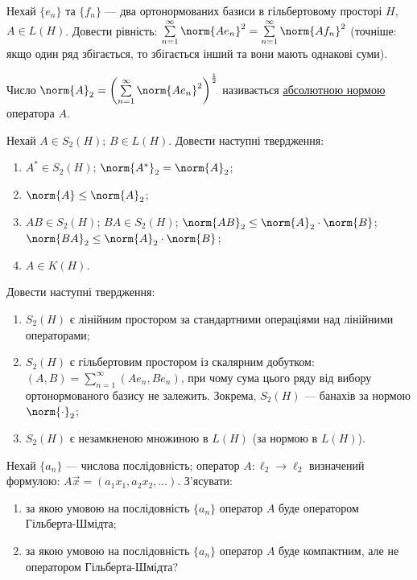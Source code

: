 
\begin{exercise}
    Нехай $\{e_n\}$ та $\{f_n\}$ --- два ортонормованих базиси в гільбертовому просторі $H$, 
    $A \in L(H)$. Довести рівність: 
    $\sum\limits_{n = 1}^\infty \norm{A e_n}^2 = \sum\limits_{n = 1}^\infty \norm{A f_n}^2$ (точніше: якщо
    один ряд збігається, то збігається інший та вони мають однакові суми).
\end{exercise}

\begin{theory}
    Число $\norm{A}_2 = \left(\sum\limits_{n = 1}^\infty \norm{A e_n}^2\right)^{\frac{1}{2}}$ називається
    \underline{абсолютною нормою} оператора $A$.
\end{theory}

\begin{exercise}
    Нехай $A \in S_2 (H)$; $B \in L(H)$. Довести наступні твердження:
    \begin{enumerate}
        \item $A^* \in S_2 (H)$; $\norm{A^*}_2 = \norm{A}_2$;
        \item $\norm{A} \leq \norm{A}_2$;
        \item $AB \in S_2 (H)$; $BA \in S_2 (H)$; $\norm{AB}_2 \leq \norm{A}_2 \cdot \norm{B}$; 
        $\norm{BA}_2 \leq \norm{A}_2 \cdot \norm{B}$;
        \item $A \in K(H)$.
    \end{enumerate}
\end{exercise}

\begin{exercise}
    Довести наступні твердження:
    \begin{enumerate}
        \item $S_2(H)$ є лінійним простором за стандартними операціями над лінійними операторами; 
        \item $S_2(H)$ є гільбертовим простором із скалярним добутком: 
        $(A, B) = \sum\limits_{n = 1}^\infty \left(A e_n, B e_n\right)$, при чому сума цього ряду від вибору
        ортонормованого базису не залежить. Зокрема, $S_2(H)$ --- банахів за нормою $\norm{\cdot}_2$;
        \item $S_2(H)$ є незамкненою множиною в $L(H)$ (за нормою в $L(H)$).
    \end{enumerate}
\end{exercise}

\begin{exercise}\label{N:1_5_42}
    Нехай $\{a_n\}$ --- числова послідовність; оператор $A:\ell_2 \rightarrow \ell_2$ визначений формулою:
    $A \vec{x} = \left(a_1 x_1, a_2 x_2, \dots \right)$. З'ясувати:
    \begin{enumerate}
        \item за якою умовою на послідовність $\{a_n\}$ оператор $A$ буде оператором Гільберта-Шмідта;
        \item за якою умовою на послідовність $\{a_n\}$ оператор $A$ буде компактним, але не оператором Гільберта-Шмідта?
    \end{enumerate}
\end{exercise}

